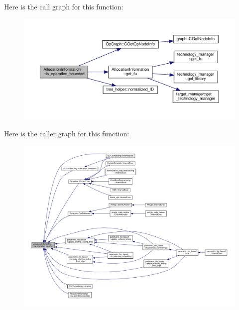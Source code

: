Here is the call graph for this function\+:
\nopagebreak
\begin{figure}[H]
\begin{center}
\leavevmode
\includegraphics[width=350pt]{d7/d79/classAllocationInformation_aad2976199807a359f2d1b79c6d4481e4_cgraph}
\end{center}
\end{figure}
Here is the caller graph for this function\+:
\nopagebreak
\begin{figure}[H]
\begin{center}
\leavevmode
\includegraphics[width=350pt]{d7/d79/classAllocationInformation_aad2976199807a359f2d1b79c6d4481e4_icgraph}
\end{center}
\end{figure}
\mbox{\label{classAllocationInformation_a3cd743252fc29a899a2079e03792515b}} 

